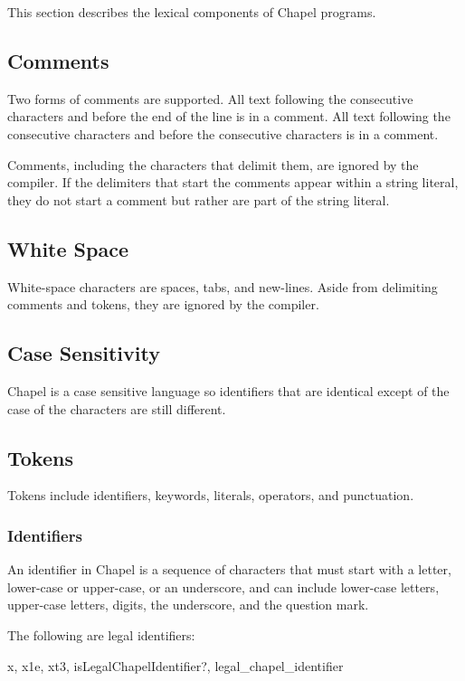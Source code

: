 \label{Lexical_Structure}

This section describes the lexical components of Chapel programs.

\subsection{Comments}
\label{Comments}

Two forms of comments are supported.  All text following the
consecutive characters \chpl{//} and before the end of the line is in
a comment.  All text following the consecutive characters \chpl{/*}
and before the consecutive characters \chpl{*/} is in a comment.

Comments, including the characters that delimit them, are ignored by
the compiler.  If the delimiters that start the comments appear within
a string literal, they do not start a comment but rather are part of
the string literal.

\subsection{White Space}
\label{White_Space}

White-space characters are spaces, tabs, and new-lines.  Aside from
delimiting comments and tokens, they are ignored by the compiler.

\subsection{Case Sensitivity}
\label{Case_Sensitivity}

Chapel is a case sensitive language so identifiers that are identical
except of the case of the characters are still different.

\subsection{Tokens}
\label{Tokens}

Tokens include identifiers, keywords, literals, operators, and
punctuation.

\subsubsection{Identifiers}
\label{Identifiers}

An identifier in Chapel is a sequence of characters that must start
with a letter, lower-case or upper-case, or an underscore, and can
include lower-case letters, upper-case letters, digits, the
underscore, and the question mark.
\begin{example}
The following are legal identifiers:
\begin{chapel}
  x, x1e, xt3, isLegalChapelIdentifier?, legal_chapel_identifier
\end{chapel}
\end{example}

